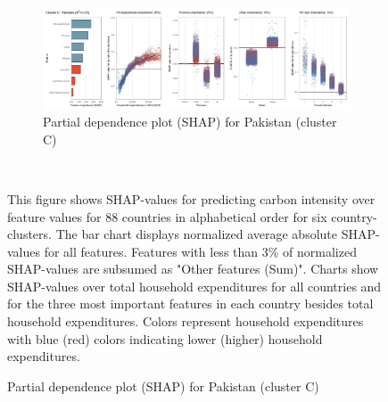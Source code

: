 \begin{figure}[ht!]
    \vspace{0.5cm}
   \begin{subfigure}[b]{\textwidth}  
   \centering
         \caption{Partial dependence plot (SHAP) for Pakistan (cluster C)}
         \label{fig:5b_PAK}
         \includegraphics[width=\textwidth]{Figure 5b/Figure_5b_PAK}
    \end{subfigure}
    \\
    \vspace{0.5cm}
   
    \begin{subcaption2}
     This figure shows SHAP-values for predicting carbon intensity over feature values for 88 countries in alphabetical order for six country-clusters. The bar chart displays normalized average absolute SHAP-values for all features. Features with less than 3\% of normalized SHAP-values are subsumed as "Other features (Sum)". Charts show SHAP-values over total household expenditures for all countries and for the three most important features in each country besides total household expenditures. Colors represent household expenditures with blue (red) colors indicating lower (higher) household expenditures.
     \end{subcaption2}
\end{figure}

